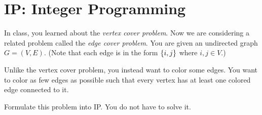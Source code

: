 \documentclass[a4paper, 10pt]{article}
\begin{document}
\subject[2110203 - Computer Engineering Mathematics II]


\section{IP: Integer Programming}


\begin{problem}
In class, you learned about the \textit{vertex cover problem}.
Now we are considering a related problem called the \textit{edge cover problem}.
You are given an undirected graph \( G = (V, E) \).
(Note that each edge is in the form \( \left\{ i, j \right\} \) where \( i, j \in V \).)

\vspace{3mm}

\par\noindent Unlike the vertex cover problem, you instead want to color some edges. You want to color
as few edges as possible such that every vertex has at least one colored edge connected to it.

\vspace{3mm}

\par\noindent Formulate this problem into IP. You do not have to solve it.
\end{problem}
\end{document}
